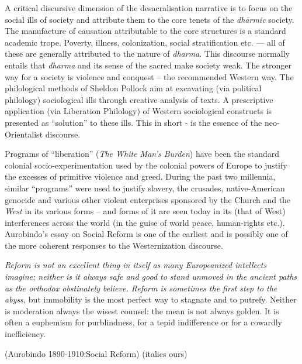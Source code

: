 A critical discursive dimension of the desacralisation narrative is to focus on the social ills of society and attribute them to the core tenets of the \textit{dhārmic} society. The manufacture of causation attributable to the core structures is a standard academic trope. Poverty, illness, colonization, social stratification etc. — all of these are generally attributed to the nature of \textit{dharma}. This discourse normally entails that \textit{dharma} and its sense of the sacred make society weak. The stronger way for a society is violence and conquest – the recommended Western way. The philological methods of Sheldon Pollock aim at excavating (via political philology) sociological ills through creative analysis of texts. A prescriptive application (via Liberation Philology) of Western sociological constructs is presented as “solution” to these ills. This in short - is the essence of the neo-Orientalist discourse.

Programs of “liberation” (\textit{The White Man's Burden}) have been the standard colonial socio-experimentation used by the colonial powers of Europe to justify the excesses of primitive violence and greed. During the past two millennia, similar “programs” were used to justify slavery, the crusades, native-American genocide and various other violent enterprises sponsored by the Church and the \textit{West} in its various forms – and forms of it are seen today in its (that of West) interferences across the world (in the guise of world peace, human-rights etc.). Aurobindo's essay on Social Reform is one of the earliest and is possibly one of the more coherent responses to the Westernization discourse.

\begin{myquote}
\textit{Reform is not an excellent thing in itself as many Europeanized intellects imagine; neither is it always safe and good to stand unmoved in the ancient paths as the orthodox obstinately believe. Reform is sometimes the first step to the abyss,} but immobility is the most perfect way to stagnate and to putrefy. Neither is moderation always the wisest counsel: the mean is not always golden. It is often a euphemism for purblindness, for a tepid indifference or for a cowardly inefficiency.
\end{myquote}

\hfill (Aurobindo 1890-1910:Social Reform) (italics ours)

